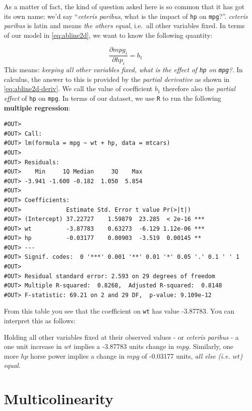 \documentclass[]{book}
\newenvironment{warning}{\begin{tcolorbox}[colback=orange!5!white,colframe=orange,title=\textbf{Warning!}]}{\end{tcolorbox}}
\theoremstyle{definition}
\theoremstyle{definition}
\theoremstyle{definition}
\theoremstyle{remark}
\begin{document}
As a matter of fact, the kind of question asked here is so common that
it has got its own name: we'd say ``\emph{ceteris paribus}, what is the
impact of \texttt{hp} on \texttt{mpg}?''. \emph{ceteris paribus} is
latin and means \emph{the others equal}, i.e.~all other variables fixed.
In terms of our model in \eqref{eq:abline2d}, we want to know the
following quantity:

\[
\frac{\partial mpg_i}{\partial hp_i} = b_1 \label{eq:abline2d-deriv}
\] This means: \emph{keeping all other variables fixed, what is the
effect of \texttt{hp} on \texttt{mpg}?}. In calculus, the answer to this
is provided by the \emph{partial derivative} as shown in
\eqref{eq:abline2d-deriv}. We call the value of coefficient \(b_1\)
therefore also the \emph{partial effect} of \texttt{hp} on \texttt{mpg}.
In terms of our dataset, we use \texttt{R} to run the following
\textbf{multiple regression}:

\begin{verbatim}
#OUT> 
#OUT> Call:
#OUT> lm(formula = mpg ~ wt + hp, data = mtcars)
#OUT> 
#OUT> Residuals:
#OUT>    Min     1Q Median     3Q    Max 
#OUT> -3.941 -1.600 -0.182  1.050  5.854 
#OUT> 
#OUT> Coefficients:
#OUT>             Estimate Std. Error t value Pr(>|t|)    
#OUT> (Intercept) 37.22727    1.59879  23.285  < 2e-16 ***
#OUT> wt          -3.87783    0.63273  -6.129 1.12e-06 ***
#OUT> hp          -0.03177    0.00903  -3.519  0.00145 ** 
#OUT> ---
#OUT> Signif. codes:  0 '***' 0.001 '**' 0.01 '*' 0.05 '.' 0.1 ' ' 1
#OUT> 
#OUT> Residual standard error: 2.593 on 29 degrees of freedom
#OUT> Multiple R-squared:  0.8268,  Adjusted R-squared:  0.8148 
#OUT> F-statistic: 69.21 on 2 and 29 DF,  p-value: 9.109e-12
\end{verbatim}

From this table you see that the coefficient on \texttt{wt} has value
-3.87783. You can interpret this as follows:

\begin{warning}
Holding all other variables fixed at their observed values - or
\emph{ceteris paribus} - a one unit increase in \(wt\) implies a
-3.87783 units change in \(mpg\). Similarly, one more \(hp\) horse power
implies a change in \(mpg\) of -0.03177 units, \emph{all else (i.e.
\(wt\)) equal}.
\end{warning}

\section{Multicolinearity}\label{multicol}
\end{document}
